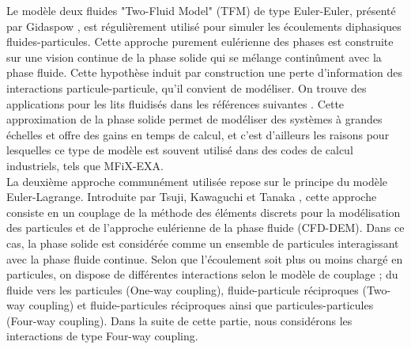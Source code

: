 Le modèle deux fluides "Two-Fluid Model" (TFM) de type Euler-Euler, présenté par Gidaspow \cite{gidaspow1994multiphase, enwald1996eulerian}, est régulièrement utilisé pour simuler les écoulements diphasiques fluides-particules. Cette approche purement eulérienne des phases est construite sur une vision continue de la phase solide qui se mélange continûment avec la phase fluide. Cette hypothèse induit par construction une perte d'information des interactions particule-particule, qu'il convient de modéliser. On trouve des applications pour les lits fluidisés dans les références suivantes \cite{godlieb2009and, cloete2013generality, wang2015numerical}. Cette approximation de la phase solide permet de modéliser des systèmes à grandes échelles et offre des gains en temps de calcul, et c'est d'ailleurs les raisons pour lesquelles ce type de modèle est souvent utilisé dans des codes de calcul industriels, tels que MFiX-EXA.\\

La deuxième approche communément utilisée repose sur le principe du modèle Euler-Lagrange. Introduite par Tsuji, Kawaguchi et Tanaka \cite{tsuji1993discrete}, cette approche consiste en un couplage de la méthode des éléments discrets pour la modélisation des particules et de l'approche eulérienne de la phase fluide (CFD-DEM). Dans ce cas, la phase solide est considérée comme un ensemble de particules interagissant avec la phase fluide continue. Selon que l'écoulement soit plus ou moins chargé en particules, on dispose de différentes interactions selon le modèle de couplage \cite{elghobashi1991particle}; du fluide vers les particules (One-way coupling), fluide-particule réciproques (Two-way coupling) et fluide-particules réciproques ainsi que particules-particules (Four-way coupling). Dans la suite de cette partie, nous considérons les interactions de type Four-way coupling.\\

